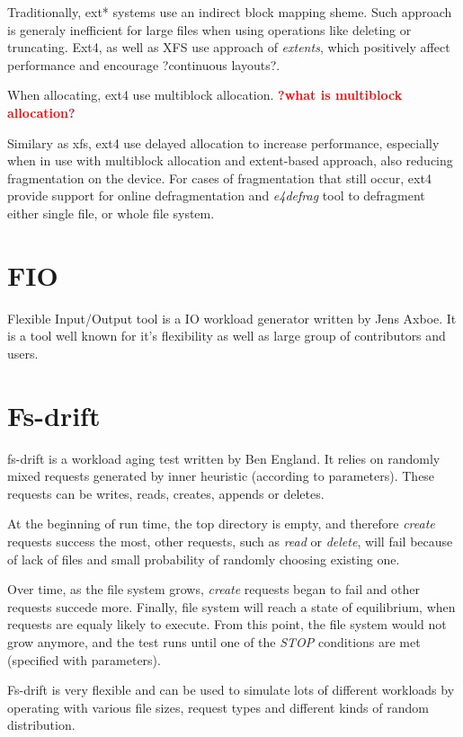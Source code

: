 \documentclass[
  color, %
  table, %
  lof,   %
  lot,   %
]{fithesis3}
\newcommand{\todo}[1]{\textcolor{red}{\textbf{#1}}}
\begin{document}
Traditionally, ext* systems use an indirect block mapping sheme. Such approach is generaly inefficient for large files when using operations like deleting or truncating. Ext4, as well as XFS use approach of \textit{extents}, which positively affect performance and encourage ?continuous layouts?.

When allocating, ext4 use multiblock allocation. 
\todo{?what is multiblock allocation?}

Similary as xfs, ext4 use delayed allocation to increase performance, especially when in use with multiblock allocation and extent-based approach, also reducing fragmentation on the device. For cases of fragmentation that still occur, ext4 provide support for online defragmentation and \textit{e4defrag} tool to defragment either single file, or whole file system.

\section{FIO}
Flexible Input/Output tool is a IO workload generator written by Jens Axboe. It is a tool well known for it's flexibility as well as large group of contributors and users.


\section{Fs-drift}
fs-drift is a workload aging test written by Ben England. It relies on randomly mixed requests generated by inner heuristic (according to parameters). These requests can be writes, reads, creates, appends or deletes.

At the beginning of run time, the top directory is empty, and therefore \textit{create} requests success the most, other requests, such as \textit{read} or \textit{delete}, will fail because of lack of files and small probability of randomly choosing existing one. 

Over time, as the file system grows, \textit{create} requests began to fail and other requests succede more. Finally, file system will reach a state of equilibrium, when requests are equaly likely to execute. From this point, the file system would not grow anymore, and the test runs until one of the \textit{STOP} conditions are met (specified with parameters).

Fs-drift is very flexible and can be used to simulate lots of different workloads by operating with various file sizes, request types and different kinds of random distribution.
\end{document}
